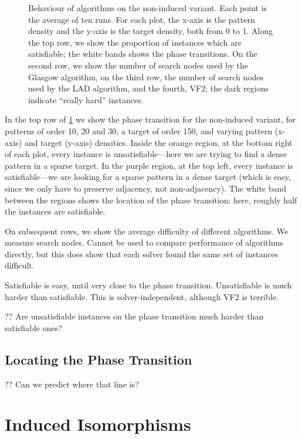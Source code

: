\documentclass[letterpaper]{article}
\begin{document}
\begin{figure}[tb]
    \hskip-0.2cm
    \setlength{\abovecaptionskip}{-2.5em}
    \caption{Behaviour of algorithms on the non-induced variant. Each point is the average of ten
        runs. For each plot, the x-axis is the pattern density and the y-axis is the target
        density, both from 0 to 1. Along the top row, we show the proportion of instances which are
        satisfiable; the white bands shows the phase transitions. On the second row, we show the
        number of search nodes used by the Glasgow algorithm, on the third row, the number of
        search nodes used by the LAD algorithm, and the fourth, VF2; the dark regions indicate
        ``really hard'' instances.}
    \label{figure:non-induced}
\end{figure}

In the top row of \cref{figure:non-induced} we show the phase transition for the non-induced
variant, for patterns of order 10, 20 and 30, a target of order 150, and varying pattern (x-axis)
and target (y-axis) densities. Inside the orange region, at the bottom right of each plot, every
instance is unsatisfiable---here we are trying to find a dense pattern in a sparse target. In the
purple region, at the top left, every instance is satisfiable---we are looking for a sparse pattern
in a dense target (which is easy, since we only have to preserve adjacency, not non-adjacency). The
white band between the regions shows the location of the phase transition: here, roughly half the
instances are satisfiable.

On subsequent rows, we show the average difficulty of different algorithms.  We measure search
nodes. Cannot be used to compare performance of algorithms directly, but this does show that each
solver found the same set of instances difficult.

Satisfiable is easy, until very close to the phase transition. Unsatisfiable is much harder than
satisfiable. This is solver-independent, although VF2 is terrible.

?? Are unsatisfiable instances on the phase transition much harder than satisfiable ones?

\subsection{Locating the Phase Transition}

?? Can we predict where that line is?

\section{Induced Isomorphisms}
\end{document}

